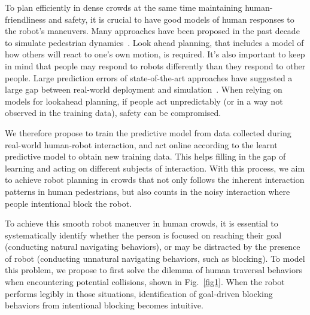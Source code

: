 \documentclass[conference]{IEEEtran}
\begin{document}
To plan efficiently in dense crowds at the same time maintaining human-friendliness and safety, it is crucial to have good models of human responses to the robot's maneuvers. Many approaches have been proposed in the past decade to simulate pedestrian dynamics~\cite{lamarche2004crowd, treuille2006continuum, %
karamouzas2009predictive}.
Look ahead planning, that includes a model of how others will react to one's 
own motion, is required. It's also important to keep in mind that people may 
respond to robots differently than they respond to other people. Large 
prediction errors of state-of-the-art approaches have suggested a large gap 
between real-world deployment and 
simulation~\cite{trautman2015robot,pfeiffer2016predicting}. When 
relying on models for lookahead planning, if people act unpredictably (or in a 
way not observed in the training data), safety can be compromised. 

We therefore propose to train the predictive model from 
data collected during real-world human-robot interaction, and 
act online according to the learnt predictive model to obtain new training data. 
This helps filling in the gap of learning and acting on different subjects of 
interaction. With this process, we aim to achieve robot planning in 
crowds that not only follows the inherent interaction patterns in human 
pedestrians, but also counts in the noisy interaction where people intentional 
block the robot.

To achieve this smooth robot maneuver in human crowds, it is essential to 
systematically identify whether the person is focused on 
reaching their goal (conducting natural navigating behaviors), or may be 
distracted by the presence of robot (conducting unnatural navigating 
behaviors, such as blocking). To model this problem, we propose to first 
solve the dilemma of human traversal behaviors when encountering potential 
collisions, shown in Fig.~\ref{fig1}. When the robot performs legibly in those 
situations, identification of goal-driven blocking behaviors from intentional 
blocking becomes intuitive. 

\end{document}
